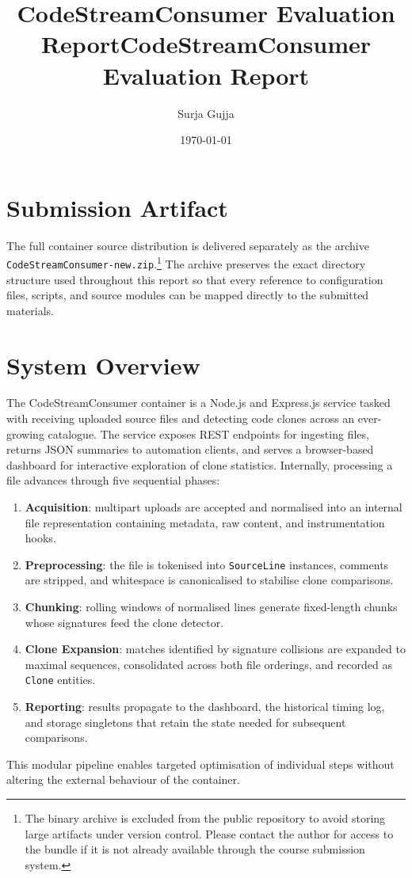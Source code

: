\documentclass[11pt]{article}
\title{CodeStreamConsumer Evaluation Report}
\author{Surja Gujja}
\title{CodeStreamConsumer Evaluation Report}
\author{}
\date{\today}
\begin{document}
\maketitle

\section*{Submission Artifact}
The full container source distribution is delivered separately as the archive \texttt{CodeStreamConsumer-new.zip}.\footnote{The binary archive is excluded from the public repository to avoid storing large artifacts under version control. Please contact the author for access to the bundle if it is not already available through the course submission system.}
The archive preserves the exact directory structure used throughout this report so that every reference to configuration files, scripts, and source modules can be mapped directly to the submitted materials.

\section*{System Overview}
The CodeStreamConsumer container is a Node.js and Express.js service tasked with receiving uploaded source files and detecting code clones across an ever-growing catalogue.
The service exposes REST endpoints for ingesting files, returns JSON summaries to automation clients, and serves a browser-based dashboard for interactive exploration of clone statistics.
Internally, processing a file advances through five sequential phases:
\begin{enumerate}[label=\textbf{\arabic*.}]
  \item \textbf{Acquisition}: multipart uploads are accepted and normalised into an internal file representation containing metadata, raw content, and instrumentation hooks.
  \item \textbf{Preprocessing}: the file is tokenised into \texttt{SourceLine} instances, comments are stripped, and whitespace is canonicalised to stabilise clone comparisons.
  \item \textbf{Chunking}: rolling windows of normalised lines generate fixed-length chunks whose signatures feed the clone detector.
  \item \textbf{Clone Expansion}: matches identified by signature collisions are expanded to maximal sequences, consolidated across both file orderings, and recorded as \texttt{Clone} entities.
  \item \textbf{Reporting}: results propagate to the dashboard, the historical timing log, and storage singletons that retain the state needed for subsequent comparisons.
\end{enumerate}
This modular pipeline enables targeted optimisation of individual steps without altering the external behaviour of the container.
\end{document}
